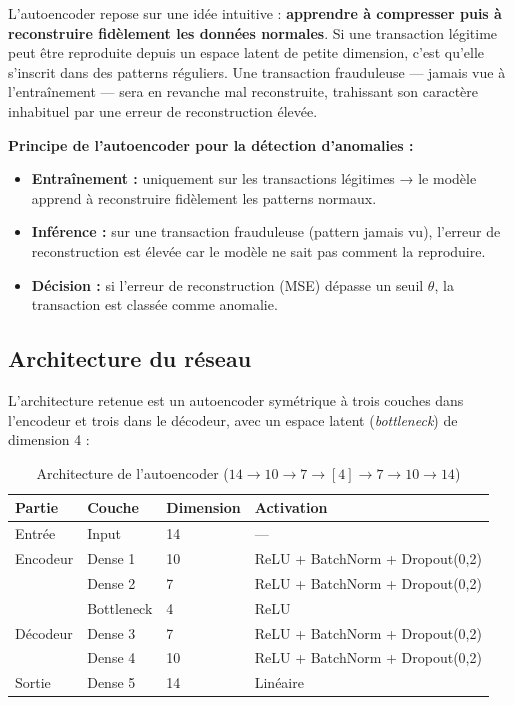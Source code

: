 L'autoencoder repose sur une idée intuitive : \textbf{apprendre à compresser puis à
reconstruire fidèlement les données normales}. Si une transaction légitime peut être
reproduite depuis un espace latent de petite dimension, c'est qu'elle s'inscrit dans des
patterns réguliers. Une transaction frauduleuse --- jamais vue à l'entraînement --- sera
en revanche mal reconstruite, trahissant son caractère inhabituel par une erreur de
reconstruction élevée.

\begin{definitionbox}
\textbf{Principe de l'autoencoder pour la détection d'anomalies :}
\begin{itemize}
  \item \textbf{Entraînement :} uniquement sur les transactions légitimes → le modèle
    apprend à reconstruire fidèlement les patterns normaux.
  \item \textbf{Inférence :} sur une transaction frauduleuse (pattern jamais vu),
    l'erreur de reconstruction est élevée car le modèle ne sait pas comment la reproduire.
  \item \textbf{Décision :} si l'erreur de reconstruction (MSE) dépasse un seuil
    $\theta$, la transaction est classée comme anomalie.
\end{itemize}
\end{definitionbox}

\subsection{Architecture du réseau}

L'architecture retenue est un autoencoder symétrique à trois couches dans l'encodeur et
trois dans le décodeur, avec un espace latent (\textit{bottleneck}) de dimension 4 :

\begin{table}[H]
\centering
\caption{Architecture de l'autoencoder ($14 \to 10 \to 7 \to [4] \to 7 \to 10 \to 14$)}
\label{tab:ae_architecture}
\begin{tabular}{llll}
\toprule
\textbf{Partie} & \textbf{Couche} & \textbf{Dimension} & \textbf{Activation} \\
\midrule
Entrée   & Input      & 14 & --- \\
Encodeur & Dense 1    & 10 & ReLU + BatchNorm + Dropout(0,2) \\
         & Dense 2    & 7  & ReLU + BatchNorm + Dropout(0,2) \\
         & Bottleneck & 4  & ReLU \\
Décodeur & Dense 3    & 7  & ReLU + BatchNorm + Dropout(0,2) \\
         & Dense 4    & 10 & ReLU + BatchNorm + Dropout(0,2) \\
Sortie   & Dense 5    & 14 & Linéaire \\
\bottomrule
\end{tabular}
\end{table}

